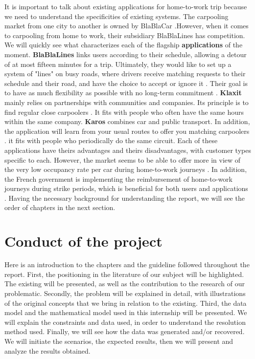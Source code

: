 \documentclass[12pt, a4paper,twoside]{memoir}
\newcommand{\newpar}{\vskip 0.2in \noindent}
\begin{document}
	It is important to talk about existing applications for home-to-work trip because we need to understand the specificities of existing systems.\newline
	The carpooling market from one city to another is owned by BlaBlaCar \cite{dionneblablacar2018}.However, when it comes to carpooling from home to work, their subsidiary BlaBlaLines has competition. We will quickly see what characterizes each of the flagship \textbf{applications} of the moment.
	\newpar
	\textbf{BlaBlaLines} links users according to their schedule, allowing a detour of at most fifteen minutes for a trip. Ultimately, they would like to set up a system of "lines" on busy roads, where drivers receive matching requests to their schedule and their road, and have the choice to accept or ignore it \cite{noauthorblablalines2017}. Their goal is to have as much flexibility as possible with no long-term commitment .
	\newpar
	\textbf{Klaxit} mainly relies on partnerships with communities and companies. Its principle is to find regular close carpoolers \cite{ARNULFKlaxit2018}. It fits with people who often have the same hours within the same company.
	\newpar
	\textbf{Karos} combines car and public transport. In addition, the application will learn from your usual routes to offer you matching carpoolers \cite{noauthorkaros2016}.
it fits with people who periodically do the same circuit.
	\newpar
	Each of these applications have theirs advantages and theirs disadvantages, with customer types specific to each. However, the market seems to be able to offer more in view of the very low occupancy rate per car during home-to-work journeys \cite{noauthoroccupancy2008}. \newline
	In addition, the French government is implementing the reimbursement of home-to-work journeys during strike periods, which is beneficial for both users and applications \cite{noauthorgreve2018}.
	\newpar
	Having the necessary background for understanding the report, we will see the order of chapters in the next section.
	\section*{Conduct of the project}
	Here is an introduction to the chapters and the guideline followed throughout the report.
	\newpar
	First, the positioning in the literature of our subject will be highlighted. The existing will be presented, as well as the contribution to the research of our problematic.\newline
	Secondly, the problem will be explained in detail, with illustrations of the original concepts that we bring in relation to the existing.\newline
	Third, the data model and the mathematical model used in this internship will be presented. We will explain the constraints and data used, in order to understand the resolution method used.\newline
	Finally, we will see how the data was generated and/or recovered. We will initiate the scenarios, the expected results, then we will present and analyze the results obtained.
	
\end{document}
